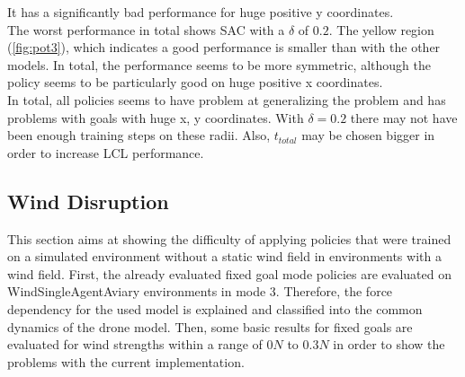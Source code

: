 It has a significantly bad performance for huge positive y coordinates.\\
The worst performance in total shows SAC with a $\delta$ of $0.2$.
The yellow region (\cref{fig:pot3}), which indicates a good performance is smaller than 
with the other models. In total, the performance seems to be more symmetric, although
the policy seems to be particularly good on huge positive x coordinates.\\
\newline
In total, all policies seems to have problem at generalizing the problem and has problems with goals 
with huge x, y coordinates. With $\delta=0.2$ there may not have been enough training steps on these radii.
Also, $t_{total}$ may be chosen bigger in order to increase LCL performance.
\subsection{Wind Disruption}
This section aims at showing the difficulty of applying policies that 
were trained on a simulated environment without a static wind field
in environments with a wind field. First, the already evaluated fixed goal mode
policies are evaluated on WindSingleAgentAviary environments in mode 3.
Therefore, the force dependency for the used model is explained and
classified into the common dynamics of the drone model.
Then, some basic results for fixed goals are evaluated for wind strengths
within a range of $0N$ to $0.3N$ in order to show the problems with the current implementation.

